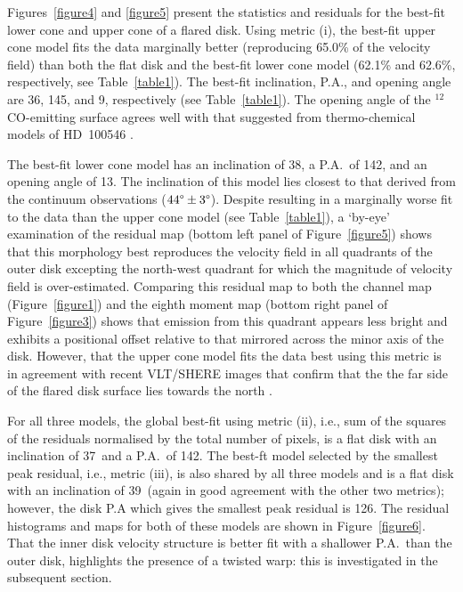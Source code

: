 \documentclass[onecolumn]{aastex6}
\begin{document}
Figures~\ref{figure4} and \ref{figure5} present the statistics and residuals
for the best-fit lower cone and upper cone of a flared disk.
Using metric (i), the best-fit upper cone model fits the data marginally better
(reproducing 65.0\% of the velocity field) than both the flat disk and the best-fit lower
cone model (62.1\% and 62.6\%, respectively, see Table~\ref{table1}).
The best-fit inclination, P.A., and opening angle are 36\degree,
145\degree, and 9\degree, respectively (see Table~\ref{table1}).
The opening angle of the $^{12}$CO-emitting surface agrees well with that
suggested from thermo-chemical models of HD~100546 \citep{bruderer12}.

The best-fit lower cone model has an inclination of 38\degree,
a P.A.~of 142\degree, and an opening angle of 13\degree.
The inclination of this model lies closest to that derived from the
continuum observations ($44\degree \pm 3\degree$).
Despite resulting in a marginally worse fit to the data than
the upper cone model (see Table~\ref{table1}), a `by-eye'
examination of the residual map (bottom left panel of
Figure~\ref{figure5}) shows that this
morphology best reproduces the velocity field in all quadrants
of the outer disk excepting the north-west quadrant for
which the magnitude of velocity field is over-estimated.
Comparing this residual map to both the
channel map (Figure~\ref{figure1}) and the
eighth moment map (bottom right panel of Figure~\ref{figure3})
shows that emission from this quadrant appears less bright
and exhibits a positional offset relative to
that mirrored across the minor axis of the disk.
However, that the upper cone model fits the data best using this metric
is in agreement with recent VLT/SHERE images that confirm that the
the far side of the flared disk surface lies towards the north \citep{garufi16}.

For all three models, the global best-fit using metric (ii), i.e.,
sum of the squares of the residuals normalised by the total number of pixels,
is a flat disk with an inclination of 37\degree~and a P.A.~of 142\degree.
The best-ft model selected by the smallest peak residual,
i.e., metric (iii), is also shared by all three models and
is a flat disk with an inclination of 39\degree~(again in good agreement
with the other two metrics); however, the disk P.A which gives the
smallest peak residual is 126\degree.
The residual histograms and maps for both of these models are
shown in Figure~\ref{figure6}.
That the inner disk velocity structure is better fit with a shallower
P.A.~than the outer disk, highlights the presence of a twisted warp:
this is investigated in the subsequent section.
\end{document}
